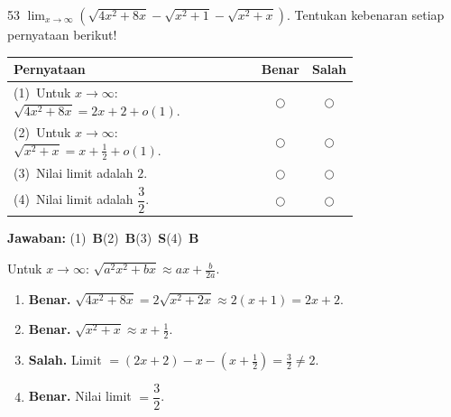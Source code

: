 \documentclass[11pt]{article}
\newcommand{\jawaban}[1]{%
  \noindent\colorbox{gold!30}{\parbox{\dimexpr\linewidth-2\fboxsep\relax}{%
    \textbf{Jawaban:} #1}}\par\smallskip}
\begin{document}
\begin{soal}{53}
$\displaystyle\lim_{x\to\infty}\!\left(\sqrt{4x^2+8x}-\sqrt{x^2+1}-\sqrt{x^2+x}\right)$.
Tentukan kebenaran setiap pernyataan berikut!

\par\smallskip
{\renewcommand{\arraystretch}{1.4}%
\begin{tabular}{@{}p{0.76\linewidth}cc@{}}
\hline\textbf{Pernyataan}&\textbf{Benar}&\textbf{Salah}\\\hline
(1)~Untuk $x\to\infty$: $\sqrt{4x^2+8x}=2x+2+o(1)$.&$\bigcirc$&$\bigcirc$\\
(2)~Untuk $x\to\infty$: $\sqrt{x^2+x}=x+\tfrac12+o(1)$.&$\bigcirc$&$\bigcirc$\\
(3)~Nilai limit adalah $2$.&$\bigcirc$&$\bigcirc$\\
(4)~Nilai limit adalah $\dfrac{3}{2}$.&$\bigcirc$&$\bigcirc$\\\hline
\end{tabular}}
\end{soal}
\begin{pembox}
\jawaban{(1)~\textbf{B}\quad(2)~\textbf{B}\quad(3)~\textbf{S}\quad(4)~\textbf{B}}
Untuk $x\to\infty$: $\sqrt{a^2x^2+bx}\approx ax+\tfrac{b}{2a}$.
\begin{enumerate}[leftmargin=*,topsep=2pt,itemsep=2pt]
\item \textbf{Benar.} $\sqrt{4x^2+8x}=2\sqrt{x^2+2x}\approx2(x+1)=2x+2$.
\item \textbf{Benar.} $\sqrt{x^2+x}\approx x+\tfrac12$.
\item \textbf{Salah.} Limit $=(2x+2)-x-(x+\tfrac12)=\tfrac32\neq2$.
\item \textbf{Benar.} Nilai limit $=\dfrac{3}{2}$.
\end{enumerate}
\end{pembox}
\end{document}
